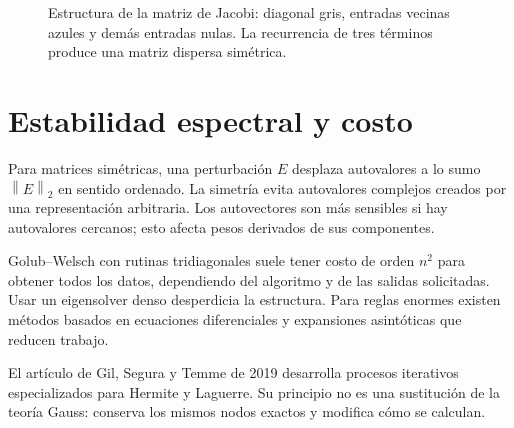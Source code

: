 \documentclass[11pt,a4paper]{article}
\newcommand{\norm}[1]{\left\lVert #1\right\rVert}
\theoremstyle{definition}
\begin{document}
\begin{figure}[htbp]
\caption{Estructura de la matriz de Jacobi: diagonal gris, entradas vecinas azules y demás entradas nulas. La recurrencia de tres términos produce una matriz dispersa simétrica.}\label{fig:cdf-10}\end{figure}

\section{Estabilidad espectral y costo}
Para matrices simétricas, una perturbación $E$ desplaza autovalores a lo sumo $\norm E_2$ en sentido ordenado. La simetría evita autovalores complejos creados por una representación arbitraria. Los autovectores son más sensibles si hay autovalores cercanos; esto afecta pesos derivados de sus componentes.

Golub--Welsch con rutinas tridiagonales suele tener costo de orden $n^2$ para obtener todos los datos, dependiendo del algoritmo y de las salidas solicitadas. Usar un eigensolver denso desperdicia la estructura. Para reglas enormes existen métodos basados en ecuaciones diferenciales y expansiones asintóticas que reducen trabajo.

El artículo de Gil, Segura y Temme de 2019 desarrolla procesos iterativos especializados para Hermite y Laguerre. Su principio no es una sustitución de la teoría Gauss: conserva los mismos nodos exactos y modifica cómo se calculan.
\end{document}
